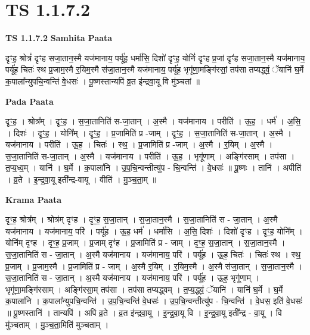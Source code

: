 \documentclass[17pt]{extarticle}
\begin{document}
\section{ TS 1.1.7.2 }

\textbf{TS 1.1.7.2 } \newline
\textbf{Samhita Paata} \newline

दृꣳह॒ श्रोत्रं॑ दृꣳह सजा॒तान॒स्मै यज॑मानाय॒ पर्यू॑ह॒ धर्मा॑सि॒ दिशो॑ दृꣳह॒ योनिं॑ दृꣳह प्र॒जां दृꣳ॑ह सजा॒तान॒स्मै यज॑मानाय॒ पर्यू॑ह॒ चितः॑ स्थ प्र॒जाम॒स्मै र॒यिम॒स्मै स॑जा॒तान॒स्मै यज॑मानाय॒ पर्यू॑ह॒ भृगू॑णा॒मङ्गि॑रसां॒ तप॑सा तप्यद्ध्वं॒ ॅयानि॑ घ॒र्मे क॒पाला᳚न्युपचि॒न्वन्ति॑ वे॒धसः॑ । पू॒ष्णस्तान्यपि॑ व्र॒त इ॑न्द्रवा॒यू वि मु॑ञ्चतां ॥ \newline

\textbf{Pada Paata} \newline

दृꣳ॒॒ह॒ । श्रोत्र᳚म् । दृꣳ॒॒ह॒ । स॒जा॒तानिति॑ स-जा॒तान् । अ॒स्मै । यज॑मानाय । परीति॑ । ऊ॒ह॒ । धर्म॑ । अ॒सि॒ । दिशः॑ । दृꣳ॒॒ह॒ । योनि᳚म् । दृꣳ॒॒ह॒ । प्र॒जामिति॑ प्र -जाम् । दृꣳ॒॒ह॒ । स॒जा॒तानिति॑ स-जा॒तान् । अ॒स्मै । यज॑मानाय । परीति॑ । ऊ॒ह॒ । चितः॑ । स्थ॒ । प्र॒जामिति॑ प्र -जाम् । अ॒स्मै । र॒यिम् । अ॒स्मै । स॒जा॒तानिति॑ स-जा॒तान् । अ॒स्मै । यज॑मानाय । परीति॑ । ऊ॒ह॒ । भृगू॑णाम् । अङ्गि॑रसाम् । तप॑सा । त॒प्य॒ध्व॒म् । यानि॑ । घ॒र्मे । क॒पाला॑नि । उ॒प॒चि॒न्वन्तीत्यु॑प - चि॒न्वन्ति॑ । वे॒धसः॑ ॥ पू॒ष्णः । तानि॑ । अपीति॑ । व्र॒ते । इ॒न्द्र॒वा॒यू इती᳚न्द्र-वायू । वीति॑ । मु॒ञ्च॒ता॒म् ॥  \newline


\textbf{Krama Paata} \newline

दृꣳ॒॒ह॒ श्रोत्र᳚म् । श्रोत्र॑म् दृꣳह । दृꣳ॒॒ह॒ स॒जा॒तान् । स॒जा॒तान॒स्मै । स॒जा॒तानिति॑ स - जा॒तान् । अ॒स्मै यज॑मानाय । यज॑मानाय॒ परि॑ । पर्यू॑ह । ऊ॒ह॒ धर्म॑ । धर्मा॑सि । अ॒सि॒ दिशः॑ । दिशो॑ दृꣳह । दृꣳ॒॒ह॒ योनि᳚म् । योनि॑म् दृꣳह । दृꣳ॒॒ह॒ प्र॒जाम् । प्र॒जाम् दृꣳ॑ह । प्र॒जामिति॑ प्र - जाम् । दृꣳ॒॒ह॒ स॒जा॒तान् । स॒जा॒तान॒स्मै । स॒जा॒तानिति॑ स - जा॒तान् । अ॒स्मै यज॑मानाय । यज॑मानाय॒ परि॑ । पर्यू॑ह । ऊ॒ह॒ चितः॑ । चितः॑ स्थ । स्थ॒ प्र॒जाम् । प्र॒जाम॒स्मै । प्र॒जामिति॑ प्र - जाम् । अ॒स्मै र॒यिम् । र॒यिम॒स्मै । अ॒स्मै स॑जा॒तान् । स॒जा॒तान॒स्मै । स॒जा॒तानिति॑ स - जा॒तान् । अ॒स्मै यज॑मानाय । यज॑मानाय॒ परि॑ । पर्यू॑ह । ऊ॒ह॒ भृगू॑णाम् । भृगू॑णा॒मङ्‍गि॑रसाम् । अङ्‍गि॑रसा॒म् तप॑सा । तप॑सा तप्यद्ध्वम् । त॒प्य॒द्ध्वं॒ ॅयानि॑ । यानि॑ घ॒र्मे । घ॒र्मे क॒पाला॑नि । क॒पाला᳚न्युपचि॒न्वन्ति॑ । उ॒प॒चि॒न्वन्ति॑ वे॒धसः॑ । उ॒प॒चि॒न्वन्तीत्यु॑प - चि॒न्वन्ति॑ । वे॒धस॒ इति॑ वे॒धसः॑ ॥ पू॒ष्णस्तानि॑ । तान्यपि॑ । अपि॑ व्र॒ते । व्र॒त इ॑न्द्रवा॒यू । इ॒न्द्र॒वा॒यू वि । इ॒न्द्र॒वा॒यू इती᳚न्द्र - वा॒यू । वि मु॑ञ्चताम् । मु॒ञ्च॒ता॒मिति॑ मुञ्चताम् । \newline
\end{document}
